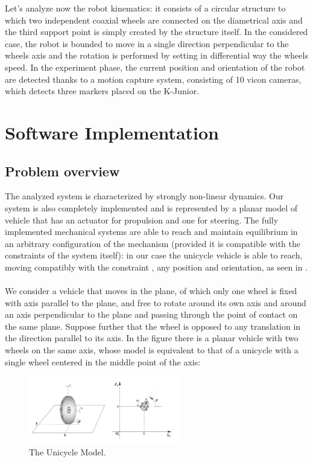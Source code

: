 \documentclass[a4paper,11pt,oneside]{book}
\begin{document}
Let's analyze now the robot kinematics: it consists of a circular structure to which two independent coaxial wheels are connected on the diametrical axis and the third support point is simply created by the structure itself. In the considered case, the robot is bounded to move in a single direction perpendicular to the wheels axis and the rotation is performed by setting in differential way the wheels speed. In the experiment phase, the current position and orientation of the robot are detected thanks to a motion capture system, consisting of 10 vicon cameras, which detects three markers placed on the K-Junior.

\chapter{Software Implementation} 

\section{Problem overview}
The analyzed system is characterized by strongly non-linear dynamics. Our system is also completely implemented and is represented by a planar model of vehicle that has an actuator for propulsion and one for steering. The fully implemented mechanical systems are able to reach and maintain equilibrium in an arbitrary configuration of the mechanism (provided it is compatible with the constraints of the system itself): in our case the unicycle vehicle is able to reach, moving compatibly with the constraint , any position and orientation, as seen in \cite{MR-GB:11}.\\
\\
We consider a vehicle that moves in the plane, of which only one wheel is fixed with axis parallel to the plane, and free to rotate around its own axis and around an axis perpendicular to the plane and passing through the point of contact on the same plane. Suppose further that the wheel is opposed to any translation in the direction parallel to its axis. In the figure there is a planar vehicle with two wheels on the same axis, whose model is equivalent to that of a unicycle with a single wheel centered in the middle point of the axis:\\

\begin{figure}[!h]
\begin{center}
\includegraphics[width=0.6\textwidth]{figs/Uniciclo}
\caption[The Unicycle Model]{The Unicycle Model.}
\end{center}
\end{figure}
\end{document}

